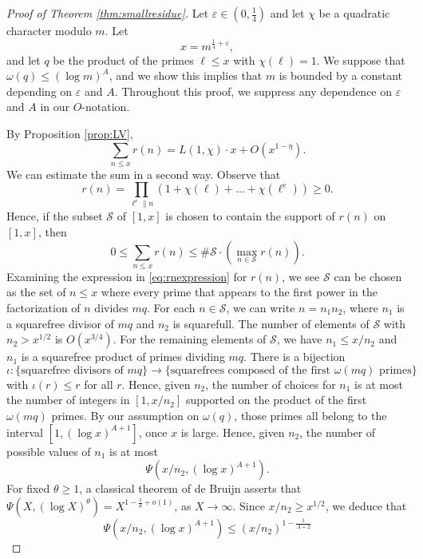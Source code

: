 \documentclass{scrartcl}
\theoremstyle{plain}
\theoremstyle{remark}
\newcommand{\Ss}{\mathcal{S}}
\newcommand{\1}{\mathbf{1}}
\begin{document}
\begin{proof}[Proof of Theorem \ref{thm:smallresidue}] Let $\varepsilon \in (0, \frac14)$ and let $\chi$ be a quadratic character modulo $m$. Let
\[ x = m^{\frac{1}{4}+\varepsilon}, \]
and let $q$ be the product of the primes $\ell \le x$ with $\chi(\ell)=1$. We suppose that $\omega(q) \le (\log{m})^{A}$, and we show this implies that $m$ is bounded by a constant depending on $\varepsilon$ and $A$. Throughout this proof, we suppress any dependence on $\varepsilon$ and $A$ in our $O$-notation.

By Proposition \ref{prop:LV},
\begin{equation} \sum_{n \le x} r(n) = L(1,\chi) \cdot x + O(x^{1-\eta}). \label{eq:ldub}\end{equation}
We can estimate the sum in a second way. Observe that
\begin{equation}\label{eq:rnexpression} r(n) = \prod_{\ell^e \parallel n} \left(1+\chi(\ell) + \dots + \chi(\ell^e)\right) \ge 0. \end{equation}
Hence, if the subset $\Ss$ of $[1,x]$ is chosen to contain the support of $r(n)$ on $[1,x]$, then
\[ 0 \le \sum_{n \le x} r(n) \le \#\Ss \cdot \left(\max_{n \in \Ss} r(n)\right). \]
Examining the expression in \eqref{eq:rnexpression} for $r(n)$, we see $\Ss$ can be chosen as the set of $n\le x$ where every prime that appears to the first power in the factorization of $n$ divides $mq$. For each $n \in \Ss$, we can write $n=n_1 n_2$, where $n_1$ is a squarefree divisor of $mq$ and $n_2$ is squarefull. The number of elements of $\Ss$ with $n_2 > x^{1/2}$ is $O(x^{3/4})$. For the remaining elements of $\Ss$, we have $n_1 \le x/n_2$ and $n_1$ is a squarefree product of primes dividing $mq$. There is a bijection
\[ \iota\colon \{\text{squarefree divisors of $mq$}\} \to \{\text{squarefrees composed of the first $\omega(mq)$ primes}\}
\]
with $\iota(r) \le r$ for all $r$. Hence, given $n_2$, the number of choices for $n_1$ is at most the number of integers in $[1,x/n_2]$ supported on the product of the first $\omega(mq)$ primes. By our assumption on $\omega(q)$, those primes all belong to the interval $[1, (\log{x})^{A+1}]$, once $x$ is large. Hence, given $n_2$, the number of possible values of $n_1$ is at most
\[ \Psi(x/n_2, (\log{x})^{A+1}). \]
For fixed $\theta \ge 1$, a classical theorem of de Bruijn \cite{dB66} asserts that  $\Psi(X,(\log{X})^{\theta}) = X^{1-\frac{1}{\theta}+o(1)}$, as $X\to\infty$.  Since $x/n_2 \ge x^{1/2}$, we deduce that
\[  \Psi(x/n_2, (\log{x})^{A+1}) \le (x/n_2)^{1-\frac{1}{A+2}} \]

\end{proof}
\end{document}
